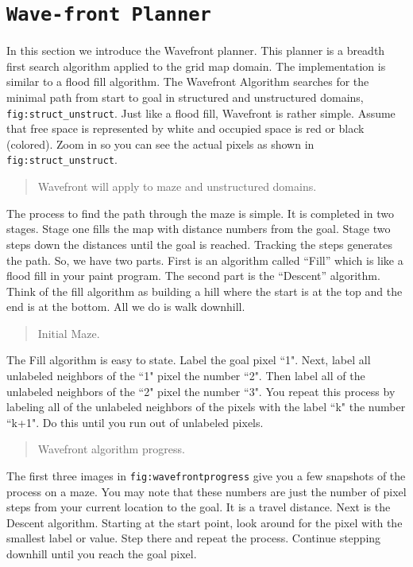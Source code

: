 \hypertarget{wave-front-planner}{%
\section{\texorpdfstring{\texttt{Wave-front\ Planner}}{Wave-front Planner}}\label{wave-front-planner}}

In this section we introduce the Wavefront planner. This planner is a
breadth first search algorithm applied to the grid map domain. The
implementation is similar to a flood fill algorithm. The Wavefront
Algorithm searches for the minimal path from start to goal in structured
and unstructured domains, \texttt{fig:struct\_unstruct}. Just like a
flood fill, Wavefront is rather simple. Assume that free space is
represented by white and occupied space is red or black (colored). Zoom
in so you can see the actual pixels as shown in
\texttt{fig:struct\_unstruct}.

\begin{quote}
Wavefront will apply to maze and unstructured domains.
\end{quote}

The process to find the path through the maze is simple. It is completed
in two stages. Stage one fills the map with distance numbers from the
goal. Stage two steps down the distances until the goal is reached.
Tracking the steps generates the path. So, we have two parts. First is
an algorithm called ``Fill'' which is like a flood fill in your paint
program. The second part is the ``Descent'' algorithm. Think of the fill
algorithm as building a hill where the start is at the top and the end
is at the bottom. All we do is walk downhill.

\begin{quote}
Initial Maze.
\end{quote}

The Fill algorithm is easy to state. Label the goal pixel ``1". Next,
label all unlabeled neighbors of the ``1" pixel the number ``2". Then
label all of the unlabeled neighbors of the ``2" pixel the number ``3".
You repeat this process by labeling all of the unlabeled neighbors of
the pixels with the label ``k" the number ``k+1". Do this until you run
out of unlabeled pixels.

\begin{quote}
Wavefront algorithm progress.
\end{quote}

The first three images in \texttt{fig:wavefrontprogress} give you a few
snapshots of the process on a maze. You may note that these numbers are
just the number of pixel steps from your current location to the goal.
It is a travel distance. Next is the Descent algorithm. Starting at the
start point, look around for the pixel with the smallest label or value.
Step there and repeat the process. Continue stepping downhill until you
reach the goal pixel.

